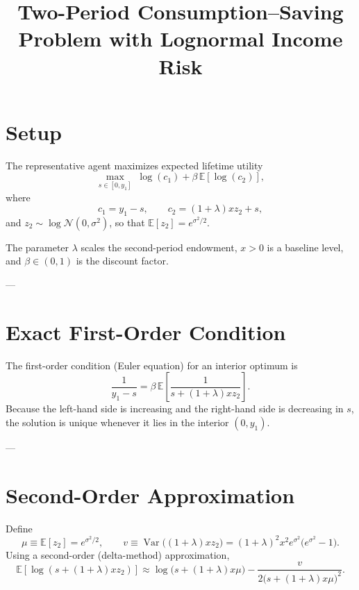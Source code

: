 \documentclass[12pt]{article}
\begin{document}
\title{Two-Period Consumption--Saving Problem with Lognormal Income Risk}
\author{}
\date{}
\maketitle

\section{Setup}

The representative agent maximizes expected lifetime utility
\begin{equation}
    \max_{s \in [0,y_1]} \; \log(c_1) + \beta \, \mathbb{E}[\log(c_2)],
\end{equation}
where
\[
c_1 = y_1 - s, 
\qquad
c_2 = (1+\lambda) x z_2 + s,
\]
and \( z_2 \sim \log\mathcal{N}(0,\sigma^2) \), so that \( \mathbb{E}[z_2] = e^{\sigma^2/2} \).

The parameter \( \lambda \) scales the second-period endowment, \( x>0 \) is a baseline level, and \( \beta \in (0,1) \) is the discount factor.

---

\section{Exact First-Order Condition}

The first-order condition (Euler equation) for an interior optimum is
\begin{equation}
    \frac{1}{y_1 - s} 
    = 
    \beta \, \mathbb{E}\!\left[\frac{1}{s + (1+\lambda)x z_2}\right].
    \label{eq:Euler}
\end{equation}
Because the left-hand side is increasing and the right-hand side is decreasing in \(s\), the solution is unique whenever it lies in the interior \((0,y_1)\).

---

\section{Second-Order Approximation}

Define
\[
\mu \equiv \mathbb{E}[z_2] = e^{\sigma^2/2}, 
\qquad
v \equiv \operatorname{Var}\big((1+\lambda)x z_2\big) 
     = (1+\lambda)^2 x^2 e^{\sigma^2}\big(e^{\sigma^2}-1\big).
\]
Using a second-order (delta-method) approximation,
\[
\mathbb{E}[\log(s+(1+\lambda)xz_2)]
\approx 
\log\big(s+(1+\lambda)x\mu\big)
-\frac{v}{2\big(s+(1+\lambda)x\mu\big)^2}.
\]
\end{document}
